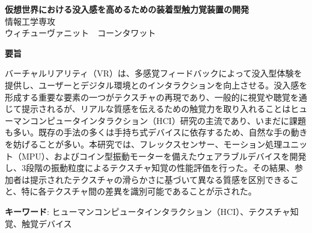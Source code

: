 \documentclass[uplatex,
12pt, %
a4paper,
english, %
oneside,
titlepage,
singlespacing, %
liststotoc, %
headsepline,
]{MastersDoctoralThesis} %
\begin{document}

\thispagestyle{empty}
\begin{center}
    \vspace*{1cm} %
    \begin{CJK*}{UTF8}{min}
      {\Large \textbf{仮想世界における没入感を高めるための装着型触力覚装置の開発}} \\ %
      \vspace{1.5cm} %
      {情報工学専攻} \\ %
      {ウィチューヴァニット　コーンタワット} \\ %
      {}
    \end{CJK*}
    \vspace*{2cm} %

\end{center}

\begin{center}
    \textbf{要旨} %
\end{center}
\vspace{0.5cm} %

		\begin{CJK*}{UTF8}{min}
			バーチャルリアリティ（VR）は、多感覚フィードバックによって没入型体験を提供し、ユーザーとデジタル環境とのインタラクションを向上させる。没入感を形成する重要な要素の一つがテクスチャの再現であり、一般的に視覚や聴覚を通じて提示されるが、リアルな質感を伝えるための触覚力を取り入れることはヒューマンコンピュータインタラクション（HCI）研究の主流であり、いまだに課題も多い。既存の手法の多くは手持ち式デバイスに依存するため、自然な手の動きを妨げることが多い。本研究では、フレックスセンサー、モーション処理ユニット（MPU）、およびコイン型振動モーターを備えたウェアラブルデバイスを開発し、3段階の振動粒度によるテクスチャ知覚の性能評価を行った。その結果、参加者は提示されたテクスチャの滑らかさに基づいて異なる質感を区別できること、特に各テクスチャ間の差異を識別可能であることが示された。
		\vspace{5mm}
		
		
		\textbf{キーワード}: ヒューマンコンピュータインタラクション（HCI）、テクスチャ知覚、触覚デバイス
		
		{}
		\end{CJK*}
\end{document}
